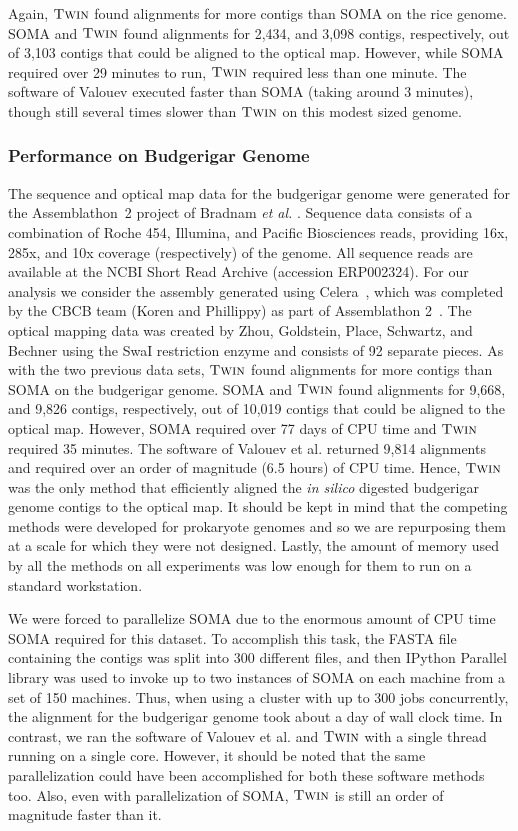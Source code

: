 Again, $\mbox{\rm \textsc{Twin}}$ found alignments for more contigs than SOMA on the rice genome.  SOMA and $\mbox{\rm \textsc{Twin}}$ found alignments for 2,434, and 3,098 contigs, respectively, out of 3,103 contigs that could be aligned to the optical map.  However, while SOMA required over 29 minutes to run, $\mbox{\rm \textsc{Twin}}$ required less than one minute.
The software of Valouev executed faster than SOMA (taking around 3 minutes), though still several times slower than $\mbox{\rm \textsc{Twin}}$ on this modest sized genome.


\subsubsection{Performance on Budgerigar Genome}
\label{section:parrot}

The sequence and optical map data for the budgerigar genome were generated for the Assemblathon~2 project of Bradnam \emph{et al.} \cite{bradnam2013assemblathon}.   Sequence data consists of  a combination of Roche 454, Illumina, and Pacific Biosciences reads, providing 16x, 285x, and 10x coverage (respectively) of the genome.  All sequence reads are available at the NCBI Short Read Archive (accession  ERP002324).  For our analysis we consider the assembly generated using Celera~\cite{celera}, which was completed by the CBCB team (Koren and Phillippy) as part of  Assemblathon 2~\cite{bradnam2013assemblathon}.  The optical mapping data was created by Zhou, Goldstein, Place, Schwartz, and Bechner using the SwaI restriction enzyme and consists of 92 separate pieces.
As with the two previous data sets, $\mbox{\rm \textsc{Twin}}$ found alignments for more contigs than SOMA on the budgerigar genome.  SOMA and $\mbox{\rm \textsc{Twin}}$ found alignments for 9,668, and 9,826 contigs, respectively, out of 10,019 contigs that could be aligned to the optical map.  However,  SOMA required over 77 days of CPU time and $\mbox{\rm \textsc{Twin}}$ required 35 minutes.  The software of Valouev et al. returned 9,814 alignments and required over an order of magnitude (6.5 hours) of CPU time.  Hence, $\mbox{\rm \textsc{Twin}}$ was the only method that efficiently aligned the \emph{in silico} digested budgerigar genome contigs to the optical map.  It should be kept in mind that the competing methods were developed for prokaryote genomes and so we are repurposing them at a scale for which they were not designed.   Lastly, the amount of memory used by all the methods on all experiments was low enough for them to run on a standard workstation.

We were forced to parallelize SOMA due to the enormous amount of CPU time SOMA required for this dataset.  To accomplish this task, the FASTA file containing the contigs was split into 300 different files, and then IPython Parallel library was used to invoke up to two instances of SOMA on each machine from a set of 150 machines.  Thus, when using a cluster with up to 300 jobs concurrently, the alignment for the budgerigar genome took about a day of wall clock time. In contrast, we ran the software of Valouev et al. and $\mbox{\rm \textsc{Twin}}$ with a single thread running on a single core.  However, it should be noted that the same parallelization could have been accomplished for both these software methods too. Also, even with parallelization of SOMA, $\mbox{\rm \textsc{Twin}}$ is still an order of magnitude faster than it.



